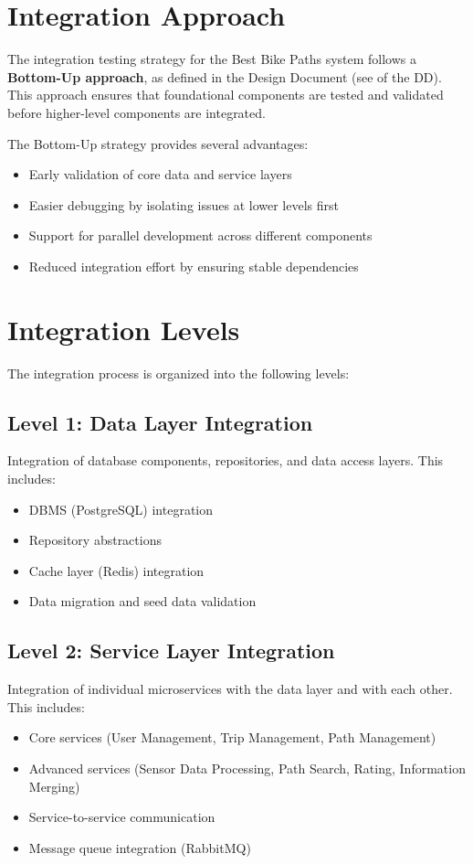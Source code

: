 \section{Integration Approach}
\label{sec:integration_approach}%

The integration testing strategy for the Best Bike Paths system follows a \textbf{Bottom-Up approach}, as defined in the Design Document (see  of the DD). This approach ensures that foundational components are tested and validated before higher-level components are integrated.

The Bottom-Up strategy provides several advantages:
\begin{itemize}
    \item Early validation of core data and service layers
    \item Easier debugging by isolating issues at lower levels first
    \item Support for parallel development across different components
    \item Reduced integration effort by ensuring stable dependencies
\end{itemize}

\section{Integration Levels}
\label{sec:integration_levels}%

The integration process is organized into the following levels:

\subsection{Level 1: Data Layer Integration}
\label{subsec:level1_data_layer}%
Integration of database components, repositories, and data access layers. This includes:
\begin{itemize}
    \item DBMS (PostgreSQL) integration
    \item Repository abstractions
    \item Cache layer (Redis) integration
    \item Data migration and seed data validation
\end{itemize}

\subsection{Level 2: Service Layer Integration}
\label{subsec:level2_service_layer}%
Integration of individual microservices with the data layer and with each other. This includes:
\begin{itemize}
    \item Core services (User Management, Trip Management, Path Management)
    \item Advanced services (Sensor Data Processing, Path Search, Rating, Information Merging)
    \item Service-to-service communication
    \item Message queue integration (RabbitMQ)
\end{itemize}

